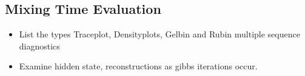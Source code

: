 \subsection{Mixing Time Evaluation}
  \begin{itemize}
    \item List the types Traceplot, Densityplots, Gelbin and Rubin multiple sequence diagnostics
    \item Examine hidden state, reconstructions as gibbs iterations occur.
  \end{itemize}


%
%
